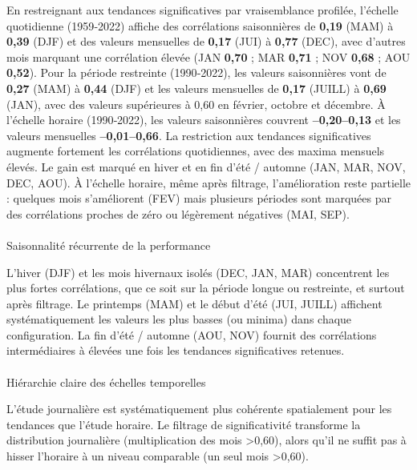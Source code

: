 \documentclass[
  article,
  nofooter,
  noheadings]{jss}
\makeatletter
\let\oldparagraph\paragraph
\renewcommand{\paragraph}{
    \@ifstar
      \xxxParagraphStar
      \xxxParagraphNoStar
  }
\newcommand{\xxxParagraphStar}[1]{\oldparagraph*{#1}\mbox{}}
\newcommand{\xxxParagraphNoStar}[1]{\oldparagraph{#1}\mbox{}}
\makeatother
\begin{document}
En restreignant aux tendances significatives par vraisemblance profilée,
l'échelle quotidienne (1959‑2022) affiche des corrélations saisonnières
de \textbf{0,19} (MAM) à \textbf{0,39} (DJF) et des valeurs mensuelles
de \textbf{0,17} (JUI) à \textbf{0,77} (DEC), avec d'autres mois
marquant une corrélation élevée (JAN \textbf{0,70} ; MAR \textbf{0,71} ;
NOV \textbf{0,68} ; AOU \textbf{0,52}). Pour la période restreinte
(1990‑2022), les valeurs saisonnières vont de \textbf{0,27} (MAM) à
\textbf{0,44} (DJF) et les valeurs mensuelles de \textbf{0,17} (JUILL) à
\textbf{0,69} (JAN), avec des valeurs supérieures à 0,60 en février,
octobre et décembre. À l'échelle horaire (1990‑2022), les valeurs
saisonnières couvrent \textbf{--0,20--0,13} et les valeurs mensuelles
\textbf{--0,01--0,66}. La restriction aux tendances significatives
augmente fortement les corrélations quotidiennes, avec des maxima
mensuels élevés. Le gain est marqué en hiver et en fin d'été / automne
(JAN, MAR, NOV, DEC, AOU). À l'échelle horaire, même après filtrage,
l'amélioration reste partielle : quelques mois s'améliorent (FEV) mais
plusieurs périodes sont marquées par des corrélations proches de zéro ou
légèrement négatives (MAI, SEP).

\paragraph{Saisonnalité récurrente de la
performance}\label{saisonnalituxe9-ruxe9currente-de-la-performance}

L'hiver (DJF) et les mois hivernaux isolés (DEC, JAN, MAR) concentrent
les plus fortes corrélations, que ce soit sur la période longue ou
restreinte, et surtout après filtrage. Le printemps (MAM) et le début
d'été (JUI, JUILL) affichent systématiquement les valeurs les plus
basses (ou minima) dans chaque configuration. La fin d'été / automne
(AOU, NOV) fournit des corrélations intermédiaires à élevées une fois
les tendances significatives retenues.

\paragraph{Hiérarchie claire des échelles
temporelles}\label{hiuxe9rarchie-claire-des-uxe9chelles-temporelles}

L'étude journalière est systématiquement plus cohérente spatialement
pour les tendances que l'étude horaire. Le filtrage de significativité
transforme la distribution journalière (multiplication des mois
\textgreater0,60), alors qu'il ne suffit pas à hisser l'horaire à un
niveau comparable (un seul mois \textgreater0,60).
\end{document}
